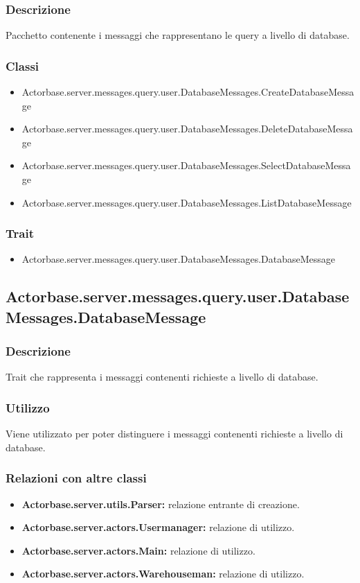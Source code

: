 \documentclass[a4paper]{article}
\begin{document}
			\subsubsection{Descrizione}
				Pacchetto contenente i messaggi che rappresentano le query a livello di database.				
				
			\subsubsection{Classi}
				\begin{itemize}
					\item Actorbase.server.messages.query.user.DatabaseMessages.CreateDatabaseMessage
					\item Actorbase.server.messages.query.user.DatabaseMessages.DeleteDatabaseMessage
					\item Actorbase.server.messages.query.user.DatabaseMessages.SelectDatabaseMessage
					\item Actorbase.server.messages.query.user.DatabaseMessages.ListDatabaseMessage
				\end{itemize}
				
			\subsubsection{Trait}
				\begin{itemize}
					\item Actorbase.server.messages.query.user.DatabaseMessages.DatabaseMessage
				\end{itemize}
				
		\subsection{Actorbase.server.messages.query.user.DatabaseMessages.DatabaseMessage}
			\subsubsection{Descrizione}
				Trait che rappresenta i messaggi contenenti richieste a livello di database.
				
			\subsubsection{Utilizzo}
				Viene utilizzato per poter distinguere i messaggi contenenti richieste a livello di database.
				
			\subsubsection{Relazioni con altre classi}
				\begin{itemize}
					\item \textbf{Actorbase.server.utils.Parser:} relazione entrante di creazione.
					\item \textbf{Actorbase.server.actors.Usermanager:} relazione di utilizzo.
					\item \textbf{Actorbase.server.actors.Main:} relazione di utilizzo.
					\item \textbf{Actorbase.server.actors.Warehouseman:} relazione di utilizzo.
				\end{itemize}
\end{document}
